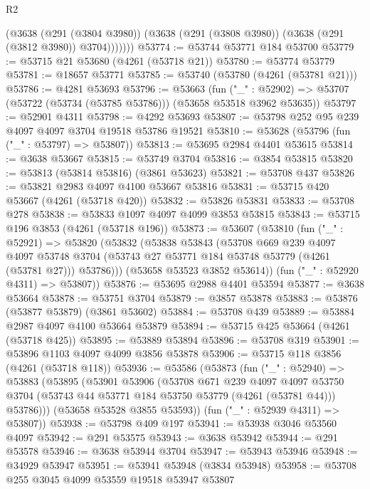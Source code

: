 \begin{lexlean}{R2}
\begin{coremodule}
            (@3638
              (@291 (@3804 @3980))
              (@3638 (@291 (@3808 @3980)) (@3638 (@291 (@3812 @3980)) @3704)))))))
@53774 := @53744 @53771 @184 @53700
@53779 := @53715 @21 @53680 (@4261 (@53718 @21))
@53780 := @53774 @53779
@53781 := @18657 @53771
@53785 := @53740 (@53780 (@4261 (@53781 @21)))
@53786 := @4281 @53693
@53796 := @53663
    (fun ("_" : @52902) => @53707 (@53722 (@53734 (@53785 @53786))) (@53658 @53518 @3962 @53635))
@53797 := @52901 @4311
@53798 := @4292 @53693
@53807 := @53798 @252 @95 @239 @4097 @4097 @3704 @19518 @53786 @19521
@53810 := @53628 (@53796 (fun ("_" : @53797) => @53807))
@53813 := @53695 @2984 @4401 @53615
@53814 := @3638 @53667
@53815 := @53749 @3704
@53816 := @3854 @53815
@53820 := @53813 (@53814 @53816) (@3861 @53623)
@53821 := @53708 @437
@53826 := @53821 @2983 @4097 @4100 @53667 @53816
@53831 := @53715 @420 @53667 (@4261 (@53718 @420))
@53832 := @53826 @53831
@53833 := @53708 @278
@53838 := @53833 @1097 @4097 @4099 @3853 @53815
@53843 := @53715 @196 @3853 (@4261 (@53718 @196))
@53873 := @53607
    (@53810
      (fun ("_" : @52921) =>
      @53820
        (@53832
          (@53838
            @53843
            (@53708
              @669
              @239
              @4097
              @4097
              @53748
              @3704
              (@53743 @27 @53771 @184 @53748 @53779 (@4261 (@53781 @27)))
              @53786)))
        (@53658 @53523 @3852 @53614))
      (fun ("_" : @52920 @4311) => @53807))
@53876 := @53695 @2988 @4401 @53594
@53877 := @3638 @53664
@53878 := @53751 @3704
@53879 := @3857 @53878
@53883 := @53876 (@53877 @53879) (@3861 @53602)
@53884 := @53708 @439
@53889 := @53884 @2987 @4097 @4100 @53664 @53879
@53894 := @53715 @425 @53664 (@4261 (@53718 @425))
@53895 := @53889 @53894
@53896 := @53708 @319
@53901 := @53896 @1103 @4097 @4099 @3856 @53878
@53906 := @53715 @118 @3856 (@4261 (@53718 @118))
@53936 := @53586
    (@53873
      (fun ("_" : @52940) =>
      @53883
        (@53895
          (@53901
            @53906
            (@53708
              @671
              @239
              @4097
              @4097
              @53750
              @3704
              (@53743 @44 @53771 @184 @53750 @53779 (@4261 (@53781 @44)))
              @53786)))
        (@53658 @53528 @3855 @53593))
      (fun ("_" : @52939 @4311) => @53807))
@53938 := @53798 @409 @197
@53941 := @53938 @3046 @53560 @4097
@53942 := @291 @53575
@53943 := @3638 @53942
@53944 := @291 @53578
@53946 := @3638 @53944 @3704
@53947 := @53943 @53946
@53948 := @34929 @53947
@53951 := @53941 @53948 (@3834 @53948)
@53958 := @53708 @255 @3045 @4099 @53559 @19518 @53947 @53807

\end{coremodule}
\end{lexlean}

